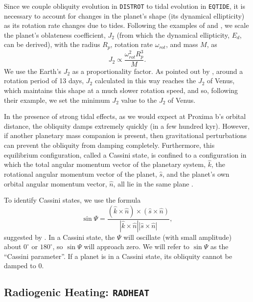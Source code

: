 \documentclass[preprint,12pt]{aastex}
\def\distrot{\texttt{\footnotesize{DISTROT}}\xspace}
\def\eqtide{\texttt{\footnotesize{EQTIDE}}\xspace}
\def\radheat{\texttt{\footnotesize{RADHEAT}}\xspace}
\begin{document}
Since we couple obliquity evolution in \distrot to tidal evolution in
\eqtide, it is necessary to account for changes in the planet's shape
(its dynamical ellipticity) as its rotation rate changes due to
tides. Following the examples of \cite{Atobe2007} and \cite{Brasser2014}, we
scale the planet's oblateness coefficient, $J_2$ (from which the
dynamical ellipticity, $E_d$, can be derived), with the radius $R_p$,
rotation rate $\omega_{rot}$, and mass $M$, as
\begin{equation}
J_2 \propto \frac{\omega_{rot}^2 R_p^3}{M}.
\end{equation}
We use the Earth's $J_2$ as a proportionality factor. As pointed out
by \cite{Brasser2014}, around a rotation period of 13 days, $J_2$
calculated in this way reaches the $J_2$ of Venus, which maintains
this shape at a much slower rotation speed, and so, following their
example, we set the minimum $J_2$ value to the $J_2$ of Venus.
 
In the presence of strong tidal effects, as we would expect at Proxima
b's orbital distance, the obliquity damps extremely quickly (in a few
hundred kyr). However, if another planetary mass companion is present,
then gravitational perturbations can prevent the obliquity from
damping completely. Furthermore, this equilibrium configuration,
called a Cassini state, is confined to a configuration in
which the total angular momentum vector of the planetary system,
$\hat{k}$, the rotational angular momentum vector of the planet,
$\hat{s}$, and the planet's own orbital angular momentum vector,
$\hat{n}$, all lie in the same plane \citep{Colombo1966}.

To identify Cassini states, we use the formula
\begin{equation}
\sin{\Psi} = \frac{(\hat{k}\times \hat{n}) \times (\hat{s} \times \hat{n})}{ | \hat{k}
\times \hat{n}  | \left | \hat{s} \times \hat{n} \right |},
\label{eqn:cassini}
\end{equation}
suggested by \cite[][]{Hamilton2004}.  In a Cassini state, the $\Psi$
will oscillate (with small amplitude) about $0^{\circ}$ or
$180^{\circ}$, so $\sin{\Psi}$ will approach zero.  We will refer to
$\sin{\Psi}$ as the ``Cassini parameter''. If a planet is in a Cassini
state, its obliquity cannot be damped to 0.

\subsection{Radiogenic Heating: \radheat}
\label{sec:models:radheat}
\end{document}
